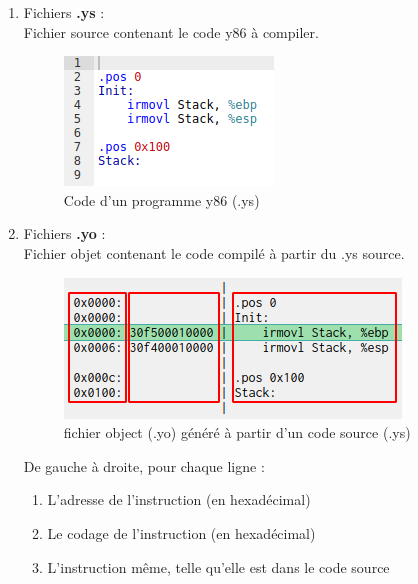 \documentclass[french]{article}
\begin{document}
\begin{enumerate}
    \item Fichiers \textbf{.ys} :\\
    Fichier source contenant le code y86 à compiler.
    \begin{figure}[H]
        \centering
        \includegraphics{img/ex_ys.png}
        \caption{Code d'un programme y86 (.ys)}
        \label{fig:ex_yo}
    \end{figure}
    
    \item Fichiers \textbf{.yo} :\\
    Fichier objet contenant le code compilé à partir du .ys source.\\
    \begin{figure}[H]
        \centering
        \includegraphics{img/ex_yo.png}
        \caption{fichier object (.yo) généré à partir d'un code source (.ys)}
        \label{fig:ex_yo}
    \end{figure}
    De gauche à droite, pour chaque ligne :
    \begin{enumerate}
        \item L'adresse de l'instruction (en hexadécimal)
        \item Le codage de l'instruction (en hexadécimal)
        \item L'instruction même, telle qu'elle est dans le code source
    \end{enumerate}
    

\end{enumerate}
\end{document}
